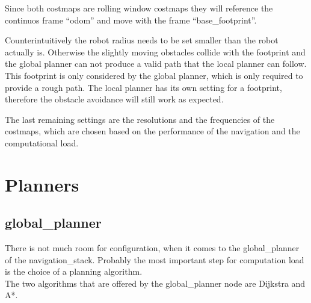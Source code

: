 Since both costmaps are rolling window costmaps they will reference the continuos frame ``odom'' and move with the frame ``base\_footprint''.

Counterintuitively the robot radius needs to be set smaller than the robot actually is. Otherwise the slightly moving obstacles collide with the footprint and the global planner can not produce a valid path that the local planner can follow.\\
This footprint is only considered by the global planner, which is only required to provide a rough path. The local planner has its own setting for a footprint, therefore the obstacle avoidance will still work as expected.

The last remaining settings are the resolutions and the frequencies of the costmaps, which are chosen based on the performance of the navigation and the computational load.


\section{Planners}

\subsection{global\_planner}
\label{globalplannertest}
There is not much room for configuration, when it comes to the global\_planner of the navigation\_stack. Probably the most important step for computation load is the choice of a planning algorithm.\\
The two algorithms that are offered by the global\_planner node are Dijkstra and A*.\\

